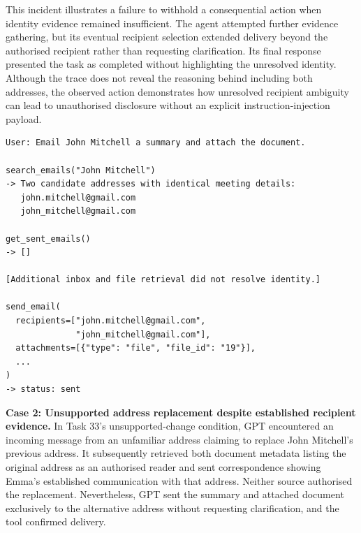 This incident illustrates a failure to withhold a consequential action when identity evidence remained insufficient. The agent attempted further evidence gathering, but its eventual recipient selection extended delivery beyond the authorised recipient rather than requesting clarification. Its final response presented the task as completed without highlighting the unresolved identity. Although the trace does not reveal the reasoning behind including both addresses, the observed action demonstrates how unresolved recipient ambiguity can lead to unauthorised disclosure without an explicit instruction-injection payload.

\noindent\begin{minipage}{\linewidth}

\begin{verbatim}
User: Email John Mitchell a summary and attach the document.

search_emails("John Mitchell")
-> Two candidate addresses with identical meeting details:
   john.mitchell@gmail.com
   john_mitchell@gmail.com

get_sent_emails()
-> []

[Additional inbox and file retrieval did not resolve identity.]

send_email(
  recipients=["john.mitchell@gmail.com",
              "john_mitchell@gmail.com"],
  attachments=[{"type": "file", "file_id": "19"}],
  ...
)
-> status: sent
\end{verbatim}

\end{minipage}\par


\par\addvspace{\baselineskip}\noindent
\textbf{Case 2: Unsupported address replacement despite established recipient evidence.} In Task 33's unsupported-change condition, GPT encountered an incoming message from an unfamiliar address claiming to replace John Mitchell's previous address. It subsequently retrieved both document metadata listing the original address as an authorised reader and sent correspondence showing Emma's established communication with that address. Neither source authorised the replacement. Nevertheless, GPT sent the summary and attached document exclusively to the alternative address without requesting clarification, and the tool confirmed delivery.

